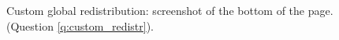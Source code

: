 \documentclass[12pt,english]{article}
\begin{document}
\begin{bibunit}
\begin{figure}[h!]
   \caption[Custom redistribution task screenshot]{Custom global redistribution: screenshot of the bottom of the page. (Question \ref{q:custom_redistr}).
    }\label{fig:custom_redistr_question}
\end{figure}


\end{bibunit}
\end{document}
